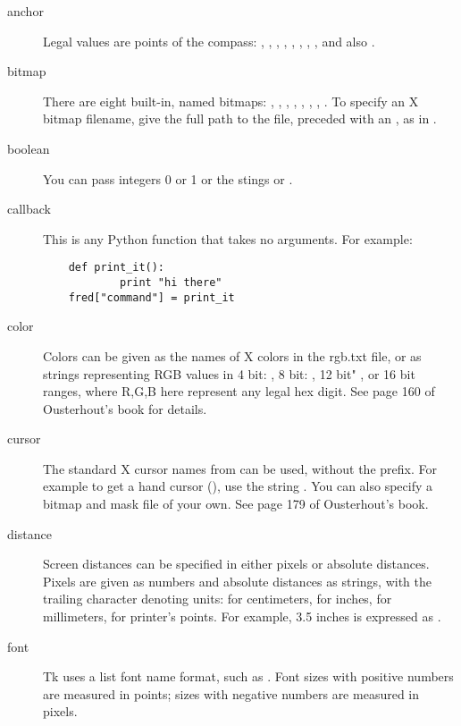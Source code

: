 \begin{description}
\item[anchor]
Legal values are points of the compass: ,
, , , ,
, , , and also
.

\item[bitmap]
There are eight built-in, named bitmaps: , ,
, , , ,
, .  To specify an X bitmap
filename, give the full path to the file, preceded with an ,
as in .

\item[boolean]
You can pass integers 0 or 1 or the stings  or  .

\item[callback]
This is any Python function that takes no arguments.  For example: 
\begin{verbatim}
    def print_it():
            print "hi there"
    fred["command"] = print_it
\end{verbatim}

\item[color]
Colors can be given as the names of X colors in the rgb.txt file,
or as strings representing RGB values in 4 bit: , 8
bit: , 12 bit" , or 16 bit
 ranges, where R,G,B here represent any
legal hex digit.  See page 160 of Ousterhout's book for details.  

\item[cursor]
The standard X cursor names from  can be used,
without the  prefix.  For example to get a hand cursor
(), use the string .  You can also
specify a bitmap and mask file of your own.  See page 179 of
Ousterhout's book.

\item[distance]
Screen distances can be specified in either pixels or absolute
distances.  Pixels are given as numbers and absolute distances as
strings, with the trailing character denoting units: 
for centimeters,  for inches,  for millimeters,
 for printer's points.  For example, 3.5 inches is expressed
as .

\item[font]
Tk uses a list font name format, such as .
Font sizes with positive numbers are measured in points;
sizes with negative numbers are measured in pixels.


\end{description}
